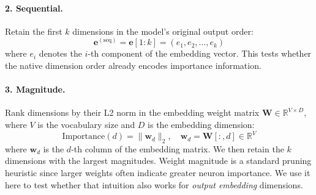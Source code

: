 \documentclass[11pt,a4paper]{article}
\begin{document}
\paragraph{2. Sequential.}
Retain the first $k$ dimensions in the model's original output order:
\begin{equation}
\mathbf{e}^{(\text{seq})} = \mathbf{e}[1:k] = (e_1, e_2, \ldots, e_k)
\end{equation}
where $e_i$ denotes the $i$-th component of the embedding vector. This tests whether the native dimension order already encodes importance information.

\paragraph{3. Magnitude.}
Rank dimensions by their L2 norm in the embedding weight matrix $\mathbf{W} \in \mathbb{R}^{V \times D}$, where $V$ is the vocabulary size and $D$ is the embedding dimension:
\begin{equation}
\mathrm{Importance}(d) = \|\mathbf{w}_d\|_2, \quad \mathbf{w}_d = \mathbf{W}[:, d] \in \mathbb{R}^V
\end{equation}
where $\mathbf{w}_d$ is the $d$-th column of the embedding matrix. We then retain the $k$ dimensions with the largest magnitudes. Weight magnitude is a standard pruning heuristic \citep{han2015pruning} since larger weights often indicate greater neuron importance. We use it here to test whether that intuition also works for \emph{output embedding} dimensions. 

\begin{table}[t]
    \centering
    \caption{Summary of the five dimension selection strategies evaluated. ``Task-aware'' indicates whether the method requires task-specific evaluation to construct the dimension ranking. $N = D/w$ is the number of chunks and $|\mathcal{T}|$ is the number of evaluation tasks.}
    \label{tab:methods_summary}
    \small
\end{table}
\end{document}
